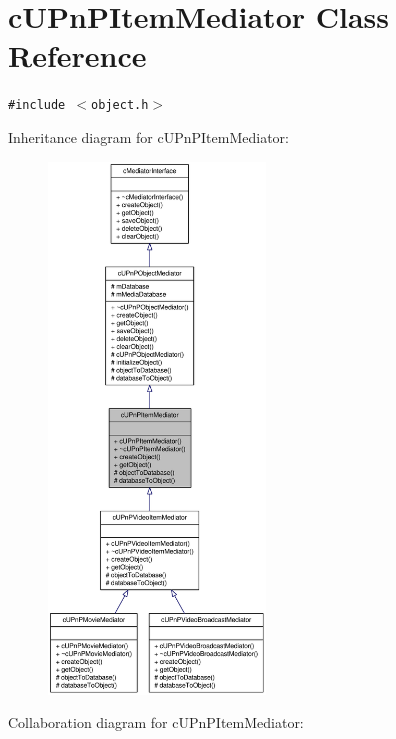 \hypertarget{classcUPnPItemMediator}{
\section{cUPnPItemMediator Class Reference}
\label{classcUPnPItemMediator}
}
{\tt \#include $<$object.h$>$}

Inheritance diagram for cUPnPItemMediator:\nopagebreak
\begin{figure}[H]
\begin{center}
\leavevmode
\includegraphics[height=400pt]{classcUPnPItemMediator__inherit__graph}
\end{center}
\end{figure}
Collaboration diagram for cUPnPItemMediator:\nopagebreak
